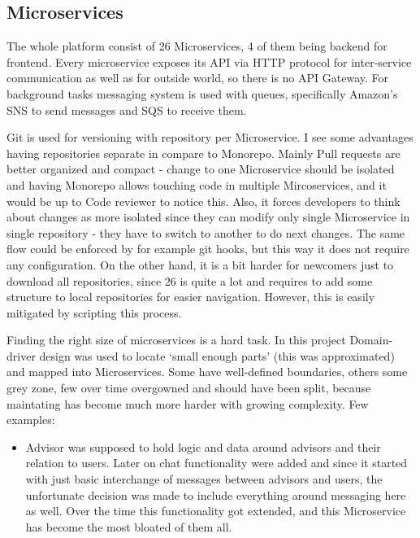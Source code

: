 \subsection{Microservices}
The whole platform consist of 26 Microservices, 4 of them being backend for frontend. Every microservice exposes its API via HTTP protocol for inter-service communication as well as for outside world, so there is no API Gateway. For background tasks messaging system is used with queues, specifically Amazon's SNS to send messages and SQS to receive them.

Git is used for versioning with repository per Microservice. I see some advantages having repositories separate in compare to Monorepo. Mainly Pull requests are better organized and compact - change to one Microservice should be isolated and having Monorepo allows touching code in multiple Mircoservices, and it would be up to Code reviewer to notice this. Also, it forces developers to think about changes as more isolated since they can modify only single Microservice in single repository - they have to switch to another to do next changes. The same flow could be enforced by for example git hooks, but this way it does not require any configuration. On the other hand, it is a bit harder for newcomers just to download all repositories, since 26 is quite a lot and requires to add some structure to local repositories for easier navigation. However, this is easily mitigated by scripting this process.

Finding the right size of microservices is a hard task. In this project Domain-driver design was used to locate `small enough parts' (this was approximated) and mapped into Microservices. Some have well-defined boundaries, others some grey zone, few over time overgowned and should have been split, because maintating has become much more harder with growing complexity. Few examples:

\begin{itemize}
    \item Advisor was supposed to hold logic and data around advisors and their relation to users. Later on chat functionality were added and since it started with just basic interchange of messages between advisors and users, the unfortunate decision was made to include everything around messaging here as well. Over the time this functionality got extended, and this Microservice has become the most bloated of them all.
\end{itemize}